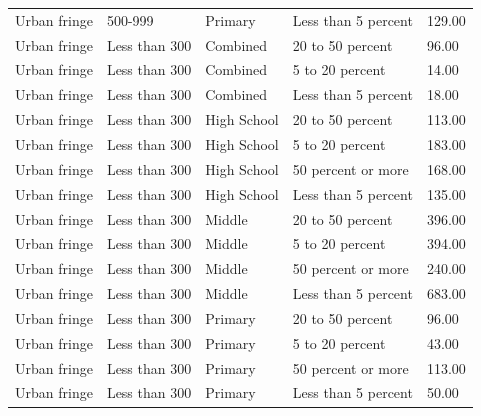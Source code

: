 \documentclass[man]{apa6}
\begin{document}
\begin{table}[tbp]
\begin{center}
\begin{threeparttable}
\begin{tabular}{lllll}
Urban fringe & 500-999 & Primary & Less than 5 percent & 129.00\\
Urban fringe & Less than 300 & Combined & 20 to 50 percent & 96.00\\
Urban fringe & Less than 300 & Combined & 5 to 20 percent & 14.00\\
Urban fringe & Less than 300 & Combined & Less than 5 percent & 18.00\\
Urban fringe & Less than 300 & High School & 20 to 50 percent & 113.00\\
Urban fringe & Less than 300 & High School & 5 to 20 percent & 183.00\\
Urban fringe & Less than 300 & High School & 50 percent or more & 168.00\\
Urban fringe & Less than 300 & High School & Less than 5 percent & 135.00\\
Urban fringe & Less than 300 & Middle & 20 to 50 percent & 396.00\\
Urban fringe & Less than 300 & Middle & 5 to 20 percent & 394.00\\
Urban fringe & Less than 300 & Middle & 50 percent or more & 240.00\\
Urban fringe & Less than 300 & Middle & Less than 5 percent & 683.00\\
Urban fringe & Less than 300 & Primary & 20 to 50 percent & 96.00\\
Urban fringe & Less than 300 & Primary & 5 to 20 percent & 43.00\\
Urban fringe & Less than 300 & Primary & 50 percent or more & 113.00\\
Urban fringe & Less than 300 & Primary & Less than 5 percent & 50.00\\
\bottomrule
\end{tabular}

\end{threeparttable}
\end{center}

\end{table}
\end{document}
